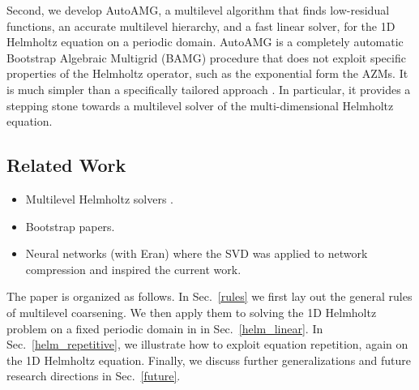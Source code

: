 \documentclass{article}
\begin{document}
Second, we develop AutoAMG, a multilevel algorithm that finds low-residual functions, an accurate multilevel hierarchy, and a fast linear solver, for the 1D Helmholtz equation on a periodic domain. AutoAMG is a completely automatic Bootstrap Algebraic Multigrid (BAMG) procedure that does not exploit specific properties of the Helmholtz operator, such as the exponential form the AZMs. It is much simpler than a specifically tailored approach  \cite{wave_ray, later_papers}. In particular, it provides a stepping stone towards a multilevel solver of the multi-dimensional Helmholtz equation.

\subsection{Related Work}
{\bf
\begin{itemize}
    \item Multilevel Helmholtz solvers \cite{wave_ray, later_papers}.
    \item Bootstrap papers.
    \item Neural networks (with Eran) where the SVD was applied to network compression and inspired the current work.
\end{itemize}
}

The paper is organized as follows. In Sec.~\ref{rules} we first lay out the general rules of multilevel coarsening. We then apply them to solving the 1D Helmholtz problem on a fixed periodic domain in in Sec.~\ref{helm_linear}. In Sec.~\ref{helm_repetitive}, we illustrate how to exploit equation repetition, again on the 1D Helmholtz equation. Finally, we discuss further generalizations and future research directions in Sec.~\ref{future}.
\end{document}

